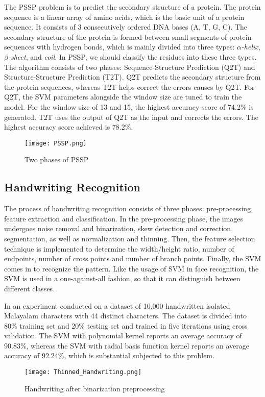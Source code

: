 The PSSP problem is to predict the secondary structure of a protein. The
protein sequence is a linear array of amino acids, which is the basic unit
of a protein sequence. It consists of 3 consecutively ordered DNA bases (A, T, G, C). 
The secondary structure of the protein is formed between small segments of 
protein sequences with hydrogen bonds, which is mainly divided into 
three types: \emph{$\alpha$-helix}, \emph{$\beta$-sheet}, and \emph{coil}. 
In PSSP, we should classify the residues into these three types.
The algorithm consists of two phases: Sequence-Structure Prediction (Q2T) and
Structure-Structure Prediction (T2T). Q2T predicts the secondary structure
from the protein sequences, whereas T2T helps correct the errors
causes by Q2T. For Q2T, the SVM parameters alongside the window size are tuned
to train the model. For the window size of 13 and 15, the highest accuracy score
of 74.2\% is generated. T2T uses the output of Q2T as the input and corrects
the errors. The highest accuracy score achieved is 78.2\%.
\cite{bioinformatics}
\begin{figure}[h]%
    \begin{center}%
        \texttt{[image: PSSP.png]}%
        \caption{Two phases of PSSP \cite{bioinformatics}}\label{fig:}%
    \end{center}%
\end{figure}

\subsection*{Handwriting Recognition}
The process of handwriting recognition consists of three phases:
pre-processing, feature extraction and classification. In the pre-processing
phase, the images undergoes noise removal and binarization, skew detection
and correction, segmentation, as well as normalization and thinning. Then, 
the feature selection technique is implemented to determine the width/height
ratio, number of endpoints, number of cross points and number of branch
points. Finally, the SVM comes in to recognize the pattern. Like the usage of
SVM in face recognition, the SVM is used in a one-against-all fashion, so that
it can distinguish between different classes.

In an experiment conducted on a dataset of 10,000 handwritten isolated
Malayalam characters with 44 distinct characters. The dataset is divided
into 80\% training set and 20\% testing set and trained in five iterations
using cross validation. The SVM with polynomial kernel reports an average
accuracy of 90.83\%, whereas the SVM with radial basis function kernel
reports an average accuracy of 92.24\%, which is substantial subjected to 
this problem.
\cite{handwriting-recognition}
\begin{figure}[h]%
    \begin{center}%
        \texttt{[image: Thinned\_Handwriting.png]}%
        \caption{Handwriting after binarization preprocessing \cite{handwriting-recognition}}\label{fig:}%
    \end{center}%
\end{figure}
